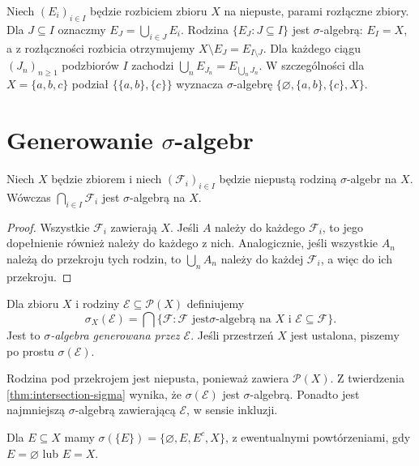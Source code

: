 \begin{przyklad}
Niech $(E_i)_{i\in I}$ będzie rozbiciem zbioru $X$ na niepuste, parami
rozłączne zbiory. Dla $J\subseteq I$ oznaczmy $E_J=\bigcup_{i\in J}E_i$.
Rodzina $\{E_J:J\subseteq I\}$ jest $\sigma$-algebrą:
$E_I=X$, a z rozłączności rozbicia otrzymujemy
$X\setminus E_J=E_{I\setminus J}$. Dla każdego ciągu
$(J_n)_{n\geq1}$ podzbiorów $I$ zachodzi
$\bigcup_n E_{J_n}=E_{\bigcup_n J_n}$.
W szczególności dla
$X=\{a,b,c\}$ podział $\{\{a,b\},\{c\}\}$ wyznacza $\sigma$-algebrę
$\{\varnothing,\{a,b\},\{c\},X\}$.
\end{przyklad}

\section{Generowanie \texorpdfstring{$\sigma$}{sigma}-algebr}

\begin{twierdzenie}
\label{thm:intersection-sigma}
Niech $X$ będzie zbiorem i niech $(\mathcal F_i)_{i\in I}$ będzie
niepustą rodziną $\sigma$-algebr na $X$. Wówczas
$\bigcap_{i\in I}\mathcal F_i$ jest $\sigma$-algebrą na $X$.
\end{twierdzenie}
\begin{proof}
Wszystkie $\mathcal F_i$ zawierają $X$. Jeśli $A$ należy do każdego
$\mathcal F_i$, to jego dopełnienie również należy do każdego z nich.
Analogicznie, jeśli wszystkie $A_n$ należą do przekroju tych rodzin,
to $\bigcup_nA_n$ należy do każdej $\mathcal F_i$, a więc do ich przekroju.
\end{proof}

\begin{definicja}
\label{def:sigma-generated}
Dla zbioru $X$ i rodziny $\mathcal E\subseteq\mathcal P(X)$ definiujemy
\[
\sigma_X(\mathcal E)=\bigcap\{\mathcal F:\mathcal F\text{ jest
$\sigma$-algebrą na }X\text{ i }\mathcal E\subseteq\mathcal F\}.
\]
Jest to \emph{$\sigma$-algebra generowana przez $\mathcal E$}.
Jeśli przestrzeń $X$ jest ustalona, piszemy po prostu $\sigma(\mathcal E)$.
\end{definicja}

Rodzina pod przekrojem jest niepusta, ponieważ zawiera $\mathcal P(X)$.
Z twierdzenia \ref{thm:intersection-sigma} wynika, że $\sigma(\mathcal E)$
jest $\sigma$-algebrą. Ponadto jest najmniejszą $\sigma$-algebrą
zawierającą $\mathcal E$, w sensie inkluzji.

\begin{przyklad}
Dla $E\subseteq X$ mamy
$\sigma(\{E\})=\{\varnothing,E,E^c,X\}$, z ewentualnymi powtórzeniami,
gdy $E=\varnothing$ lub $E=X$.
\end{przyklad}

